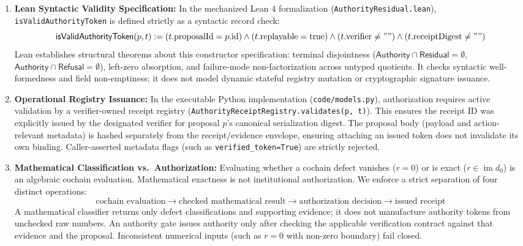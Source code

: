 \documentclass[
  10pt,
]{article}
\begin{document}
\begin{enumerate}
\def\labelenumi{\arabic{enumi}.}
\item
  \textbf{Lean Syntactic Validity Specification:} In the mechanized Lean 4 formalization (\texttt{AuthorityResidual.lean}), \texttt{isValidAuthorityToken} is defined strictly as a syntactic record check: \hypertarget{math-E0011-0011}{}{\[\mathsf{isValidAuthorityToken}(p, t) := (t.\mathrm{proposalId} = p.\mathrm{id}) \wedge (t.\mathrm{replayable} = \mathrm{true}) \wedge (t.\mathrm{verifier} \ne "") \wedge (t.\mathrm{receiptDigest} \ne "")\]} Lean establishes structural theorems about this constructor specification: terminal disjointness (\hypertarget{math-E0012-0012}{}{\(\mathsf{Authority} \cap \mathsf{Residual} = \emptyset\)}, \hypertarget{math-E0013-0013}{}{\(\mathsf{Authority} \cap \mathsf{Refusal} = \emptyset\)}), left-zero absorption, and failure-mode non-factorization across untyped quotients. It checks syntactic well-formedness and field non-emptiness; it does not model dynamic stateful registry mutation or cryptographic signature issuance.
\item
  \textbf{Operational Registry Issuance:} In the executable Python implementation (\texttt{code/models.py}), authorization requires active validation by a verifier-owned receipt registry (\texttt{AuthorityReceiptRegistry.validates(p,\ t)}). This ensures the receipt ID was explicitly issued by the designated verifier for proposal \hypertarget{math-E0014-0014}{}{\(p\)}'s canonical serialization digest. The proposal body (payload and action-relevant metadata) is hashed separately from the receipt/evidence envelope, ensuring attaching an issued token does not invalidate its own binding. Caller-asserted metadata flags (such as \texttt{verified\_token=True}) are strictly rejected.
\item
  \textbf{Mathematical Classification vs.~Authorization:} Evaluating whether a cochain defect vanishes (\hypertarget{math-E0015-0015}{}{\(r = 0\)}) or is exact (\hypertarget{math-E0016-0016}{}{\(r \in \operatorname{im} d_0\)}) is an algebraic cochain evaluation. Mathematical exactness is not institutional authorization. We enforce a strict separation of four distinct operations: \hypertarget{math-E0017-0017}{}{\[\text{cochain evaluation} \longrightarrow \text{checked mathematical result} \longrightarrow \text{authorization decision} \longrightarrow \text{issued receipt}\]} A mathematical classifier returns only defect classifications and supporting evidence; it does not manufacture authority tokens from unchecked raw numbers. An authority gate issues authority only after checking the applicable verification contract against that evidence and the proposal. Inconsistent numerical inputs (such as \hypertarget{math-E0015-0018}{}{\(r = 0\)} with non-zero boundary) fail closed.
\end{enumerate}
\end{document}
